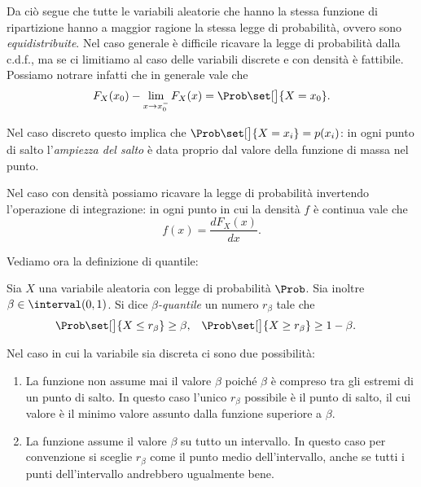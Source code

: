 Da ciò segue che tutte le variabili aleatorie che hanno la stessa funzione di ripartizione hanno a maggior ragione la stessa legge di probabilità, ovvero sono \emph{equidistribuite}. Nel caso generale è difficile ricavare la legge di probabilità dalla c.d.f., ma se ci limitiamo al caso delle variabili discrete e con densità è fattibile. Possiamo notrare infatti che in generale vale che \[
    F_X(x_0) - \lim_{x \to x_0^-} F_X(x) = \Prob\set[\big]{X = x_0}.    
\]

Nel caso discreto questo implica che $\Prob\set[\big]{X = x_i} = p(x_i)$: in ogni punto di salto l'\emph{ampiezza del salto} è data proprio dal valore della funzione di massa nel punto.

Nel caso con densità possiamo ricavare la legge di probabilità invertendo l'operazione di integrazione: in ogni punto in cui la densità $f$ è continua vale che \[
    f(x) = \frac{dF_X(x)}{dx}.    
\]

Vediamo ora la definizione di quantile:
\begin{definition}
    [Quantile]
    Sia $X$ una variabile aleatoria con legge di probabilità $\Prob$. Sia inoltre $\beta \in \interval({0, 1})$. Si dice \emph{$\beta$-quantile} un numero $r_\beta$ tale che \begin{align*}
        \Prob\set[\big]{X \leq r_\beta} \geq \beta,\quad &\Prob\set[\big]{X \geq r_\beta} \geq 1 - \beta.   
    \end{align*}
\end{definition}

Nel caso in cui la variabile sia discreta ci sono due possibilità:
\begin{enumerate}
    \item La funzione non assume mai il valore $\beta$ poiché $\beta$ è compreso tra gli estremi di un punto di salto.
    In questo caso l'unico $r_\beta$ possibile è il punto di salto, il cui valore è il minimo valore assunto dalla funzione superiore a $\beta$.

    \item La funzione assume il valore $\beta$ su tutto un intervallo. In questo caso per convenzione si sceglie $r_\beta$ come il punto medio dell'intervallo, anche se tutti i punti dell'intervallo andrebbero ugualmente bene.
\end{enumerate}
\begin{figure}[H]
    \begin{center}
        
    \end{center}
\end{figure}

